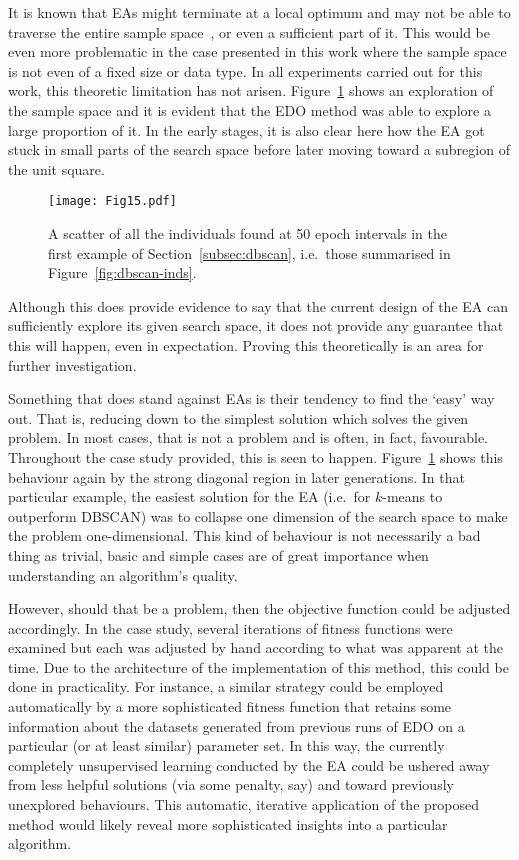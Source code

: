 It is known that EAs might terminate at a local optimum and may not be able to
traverse the entire sample space~\cite{Vikhar2016}, or even a sufficient part of
it. This would be even more problematic in the case presented in this work where
the sample space is not even of a fixed size or data type. In all experiments
carried out for this work, this theoretic limitation has not arisen.
Figure~\ref{fig:coverage} shows an exploration of the sample space and it is
evident that the EDO method was able to explore a large proportion of it. In the
early stages, it is also clear here how the EA got stuck in small parts of the
search space before later moving toward a subregion of the unit square.

\begin{figure}[htbp]
    \texttt{[image: Fig15.pdf]}
    \caption{%
        A scatter of all the individuals found at 50 epoch intervals in the
        first example of Section~\ref{subsec:dbscan}, i.e.\ those summarised in
        Figure~\ref{fig:dbscan-inds}.
    }\label{fig:coverage}
\end{figure}

Although this does provide evidence to say that the current design of the EA can
sufficiently explore its given search space, it does not provide any guarantee
that this will happen, even in expectation. Proving this theoretically is an
area for further investigation.

Something that does stand against EAs is their tendency to find the `easy' way
out. That is, reducing down to the simplest solution which solves the given
problem. In most cases, that is not a problem and is often, in fact, favourable.
Throughout the case study provided, this is seen to happen.
Figure~\ref{fig:coverage} shows this behaviour again by the strong diagonal
region in later generations. In that particular example, the easiest solution
for the EA (i.e.\ for \(k\)-means to outperform DBSCAN) was to collapse one
dimension of the search space to make the problem one-dimensional. This kind of
behaviour is not necessarily a bad thing as trivial, basic and simple cases are
of great importance when understanding an algorithm's quality.

However, should that be a problem, then the objective function could be adjusted
accordingly. In the case study, several iterations of fitness functions were
examined but each was adjusted by hand according to what was apparent at the
time. Due to the architecture of the implementation of this method, this could
be done in practicality. For instance, a similar strategy could be employed
automatically by a more sophisticated fitness function that retains some
information about the datasets generated from previous runs of EDO on a
particular (or at least similar) parameter set. In this way, the currently
completely unsupervised learning conducted by the EA could be ushered away from
less helpful solutions (via some penalty, say) and toward previously unexplored
behaviours. This automatic, iterative application of the proposed method would
likely reveal more sophisticated insights into a particular algorithm.

